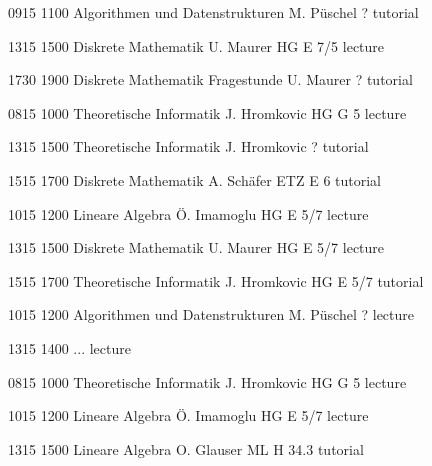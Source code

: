 \documentclass[a4paper, landscape]{article}
\begin{document}
\begin{timetable}

   {0915} {1100}
  {Algorithmen und Datenstrukturen}
  {M. Püschel}
  {?}
  {tutorial}

   {1315} {1500}
  {Diskrete Mathematik}
  {U. Maurer}
  {HG E 7/5}
  {lecture}

   {1730} {1900}
  {Diskrete Mathematik Fragestunde}
  {U. Maurer}
  {?}
  {tutorial}


   {0815} {1000}
  {Theoretische Informatik}
  {J. Hromkovic}
  {HG G 5}
  {lecture}

   {1315} {1500}
  {Theoretische Informatik}
  {J. Hromkovic}
  {?}
  {tutorial}

   {1515} {1700}
  {Diskrete Mathematik}
  {A. Schäfer}
  {ETZ E 6}
  {tutorial}


   {1015} {1200}
  {Lineare Algebra}
  {Ö. Imamoglu}
  {HG E 5/7}
  {lecture}

   {1315} {1500}
  {Diskrete Mathematik}
  {U. Maurer}
  {HG E 5/7}
  {lecture}

   {1515} {1700}
  {Theoretische Informatik}
  {J. Hromkovic}
  {HG E 5/7}
  {tutorial}


   {1015} {1200}
  {Algorithmen und Datenstrukturen}
  {M. Püschel}
  {?}
  {lecture}

   {1315} {1400}
  {...}
  {}
  {}
  {lecture}


   {0815} {1000}
  {Theoretische Informatik}
  {J. Hromkovic}
  {HG G 5}
  {lecture}

   {1015} {1200}
  {Lineare Algebra}
  {Ö. Imamoglu}
  {HG E 5/7}
  {lecture}

   {1315} {1500}
  {Lineare Algebra}
  {O. Glauser}
  {ML H 34.3}
  {tutorial}

\end{timetable}
\end{document}
